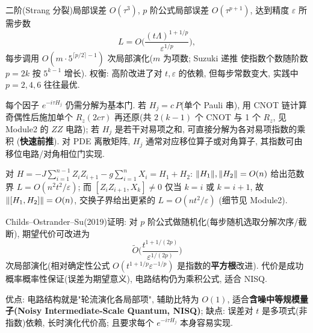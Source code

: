 \documentclass[utf8]{article} %
\numberwithin{equation}{section}   %
\newtheorem{Thm}{\hskip 2em {\color{blue} 定理}}[subsection]
\newtheorem{Note}{\hskip 2em {\color{red} 注}}[subsection]
\newtheorem{Eg}{\hskip 2em {\color{black} 例}}[subsection]
\begin{document}
\begin{Thm}[高阶 Suzuki 公式]
    二阶(Strang 分裂)局部误差 $O(\tau^3)$, $p$ 阶公式局部误差 $O(\tau^{p+1})$,
    达到精度 $\varepsilon$ 所需步数
    \begin{equation}
        L = O\!\Big(\frac{(t\Lambda)^{1+1/p}}{\varepsilon^{1/p}}\Big),
    \end{equation}
    每步调用 $O(m\cdot 5^{\lceil p/2\rceil-1})$ 次局部演化($m$ 为项数; Suzuki 递推
    使指数个数随阶数 $p = 2k$ 按 $5^{k-1}$ 增长). 权衡: 高阶改进了对 $t,\varepsilon$ 的依赖,
    但每步常数变大, 实践中 $p = 2, 4, 6$ 往往最优.
\end{Thm}

\begin{Note}[局部演化的实现]
    每个因子 $e^{-i\tau H_j}$ 仍需分解为基本门. 若 $H_j = c\,P$(单个 Pauli 串),
    用 CNOT 链计算奇偶性后施加单个 $R_z(2c\tau)$ 再还原(共 $2(k-1)$ 个 CNOT 与 1 个 $R_z$,
    见 Module2 的 $ZZ$ 电路); 若 $H_j$ 是若干对易项之和, 可直接分解为各对易项指数的乘积
    (\textbf{快速前推}). 对 PDE 离散矩阵, $H_j$ 通常对应移位算子或对角算子,
    其指数可由移位电路/对角相位门实现.
\end{Note}

\begin{Eg}
    对 $H = -J\sum_{i=1}^{n-1}Z_iZ_{i+1} - g\sum_{i=1}^n X_i = H_1 + H_2$:
    $\norm{H_1},\norm{H_2} = O(n)$ 给出范数界 $L = O(n^2t^2/\varepsilon)$;
    而 $[Z_iZ_{i+1},X_k] \ne 0$ 仅当 $k = i$ 或 $k = i+1$, 故
    $\norm{[H_1,H_2]} = O(n)$, 交换子界给出更紧的 $L = O(nt^2/\varepsilon)$
    (细节见 Module2).
\end{Eg}

\begin{Note}
    Childs--Ostrander--Su(2019)证明: 对 $p$ 阶公式做随机化(每步随机选取分解次序/截断),
    期望代价可改进为
    \begin{equation}
        \widetilde O\!\Big(\frac{t^{1+1/(2p)}}{\varepsilon^{1/(2p)}}\Big)
    \end{equation}
    次局部演化(相对确定性公式 $O(t^{1+1/p}\varepsilon^{-1/p})$ 是指数的\textbf{平方根}改进).
    代价是成功概率概率性保证(误差为期望意义), 电路结构仍为乘积公式, 适合 NISQ.
\end{Note}

\begin{Note}
    优点: 电路结构就是"轮流演化各局部项", 辅助比特为 $O(1)$,
    适合\textbf{含噪中等规模量子(Noisy Intermediate-Scale Quantum, NISQ)};
    缺点: 误差对 $t$ 是多项式(非指数)依赖, 长时演化代价高;
    且要求每个 $e^{-i\tau H_j}$ 本身容易实现.
\end{Note}
\end{document}
